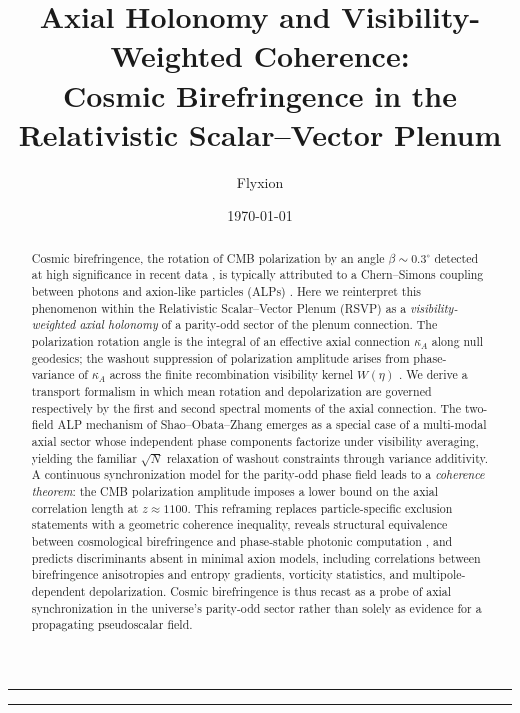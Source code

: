 \documentclass[12pt]{article}
\title{\textbf{Axial Holonomy and Visibility-Weighted Coherence:\\[4pt]
Cosmic Birefringence in the Relativistic Scalar--Vector Plenum}}
\author{Flyxion}
\date{\today}
\theoremstyle{definition}
\begin{document}
\maketitle
\thispagestyle{empty}

\begin{abstract}
Cosmic birefringence, the rotation of CMB polarization by an angle
$\beta\sim 0.3^\circ$ detected at high significance in recent data
\cite{MinamiKomatsu2020,Eskilt2022,Diego-Palazuelos2023},
is typically attributed to a Chern--Simons coupling between photons
and axion-like particles (ALPs) \cite{Carroll1990,Lue1999}.
Here we reinterpret this phenomenon within the
Relativistic Scalar--Vector Plenum (RSVP)
as a \emph{visibility-weighted axial holonomy} of a
parity-odd sector of the plenum connection.
The polarization rotation angle is the integral of an effective axial
connection $\kappa_A$ along null geodesics;
the washout suppression of polarization amplitude arises from
phase-variance of $\kappa_A$ across the finite recombination visibility
kernel $W(\eta)$ \cite{Fujita2021,Sherfield2023}.
We derive a transport formalism in which mean rotation and depolarization
are governed respectively by the first and second spectral moments of the
axial connection.
The two-field ALP mechanism of Shao--Obata--Zhang \cite{ShaoObataZhang2025}
emerges as a special case of a multi-modal axial sector whose independent
phase components factorize under visibility averaging, yielding the
familiar $\sqrt{N}$ relaxation of washout constraints through variance additivity.
A continuous synchronization model for the parity-odd phase field leads to
a \emph{coherence theorem}: the CMB polarization amplitude imposes a lower
bound on the axial correlation length at $z\approx1100$.
This reframing replaces particle-specific exclusion statements with a
geometric coherence inequality, reveals structural equivalence between
cosmological birefringence and phase-stable photonic computation
\cite{Ozawa2019,Joannopoulos2008}, and predicts discriminants absent
in minimal axion models, including correlations between birefringence
anisotropies and entropy gradients, vorticity statistics, and
multipole-dependent depolarization.
Cosmic birefringence is thus recast as a probe of axial synchronization
in the universe's parity-odd sector rather than solely as evidence for
a propagating pseudoscalar field.
\end{abstract}

\vspace{2pt}
\noindent\rule{\textwidth}{0.4pt}
\tableofcontents
\vspace{4pt}
\noindent\rule{\textwidth}{0.4pt}
\end{document}
